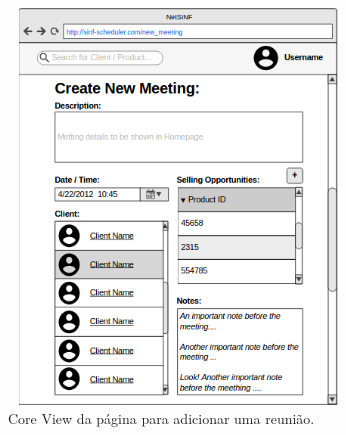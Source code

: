 \begin{titlepage}
\begin{figure}[H]
  \centering
    \includegraphics[width=9cm, height = 10.5cm]{SINF_newmeeting.png}
  \caption{Core View da página para adicionar uma reunião.}
  \label{uml}
\end{figure}


\end{titlepage}
